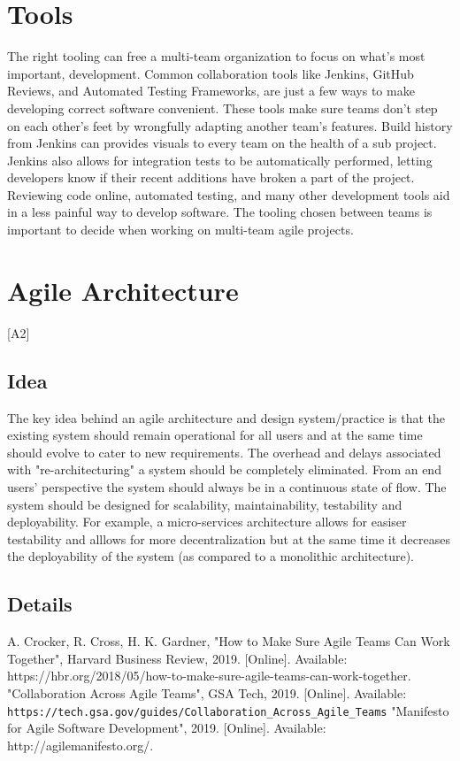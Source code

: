 \documentclass[sigplan,screen]{acmart}
\begin{document}
\section{Tools}
The right tooling can free a multi-team organization to focus on what's most important, development.
Common collaboration tools like Jenkins, GitHub Reviews, and Automated Testing Frameworks, are just a few ways to make developing correct software convenient.
These tools make sure teams don't step on each other's feet by wrongfully adapting another team's features.
Build history from Jenkins can provides visuals to every team on the health of a sub project.
Jenkins also allows for integration tests to be automatically performed, letting developers know if their recent additions have broken a part of the project.
Reviewing code online, automated testing, and many other development tools aid in a less painful way to develop software.
The tooling chosen between teams is important to decide when working on multi-team agile projects.

\section{Agile Architecture} [A2]
\subsection{Idea}
The key idea behind an agile architecture and design system/practice is that the existing system should remain operational for all users and at the same time should evolve to cater to new requirements.
The overhead and delays associated with "re-architecturing" a system should be completely eliminated. From an end users' perspective the system should always be in a continuous state of flow.
The system should be designed for scalability, maintainability, testability and deployability. For example, a micro-services architecture allows for easiser testability and alllows for more decentralization but at the same time it decreases the deployability of the system (as compared to a monolithic architecture).
\subsection{Details}

% 
% 

\begin{thebibliography}{00}
   A. Crocker, R. Cross, H. K. Gardner, "How to Make Sure Agile Teams Can Work Together", Harvard Business Review, 2019. [Online]. Available: https://hbr.org/2018/05/how-to-make-sure-agile-teams-can-work-together.
   "Collaboration Across Agile Teams", GSA Tech, 2019. [Online]. Available: \verb| https://tech.gsa.gov/guides/Collaboration_Across_Agile_Teams|
   "Manifesto for Agile Software Development", 2019. [Online]. Available: http://agilemanifesto.org/.
\end{thebibliography}
\end{document}
